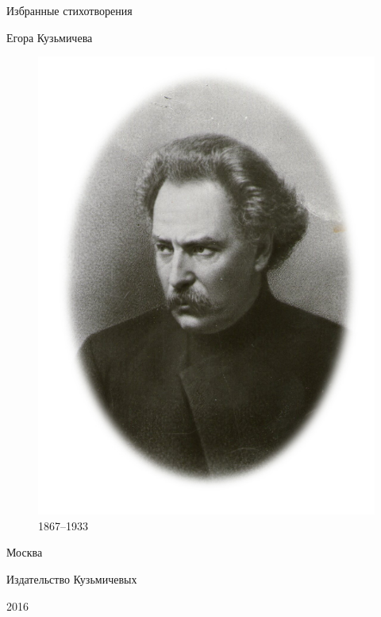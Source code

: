 \begin{titlepage}
  \begin{center}

\vfill

{\huge Избранные стихотворения}

\vskip 5pt
{\large Егора Кузьмичева}

\vspace*{0.5cm}
\begin{figure}[htp]
  \begin{center}
	  \includegraphics[scale=0.6]{kuzmichev_oval.pdf}
	  \caption*{1867--1933}
  \end{center}
\end{figure}

\vfill
{\small
Москва

Издательство Кузьмичевых

2016
}
\end{center}
\end{titlepage}
